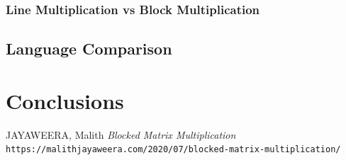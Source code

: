 \documentclass{report}
\begin{document}
			\subsection{Line Multiplication vs Block Multiplication}
			
		\section{Language Comparison}
	
	\chapter{Conclusions}
	
	\begin{thebibliography}{1}
		JAYAWEERA, Malith \textit{Blocked Matrix Multiplication}
		\\\texttt{https://malithjayaweera.com/2020/07/blocked-matrix-multiplication/}
	\end{thebibliography}
	
\end{document}
